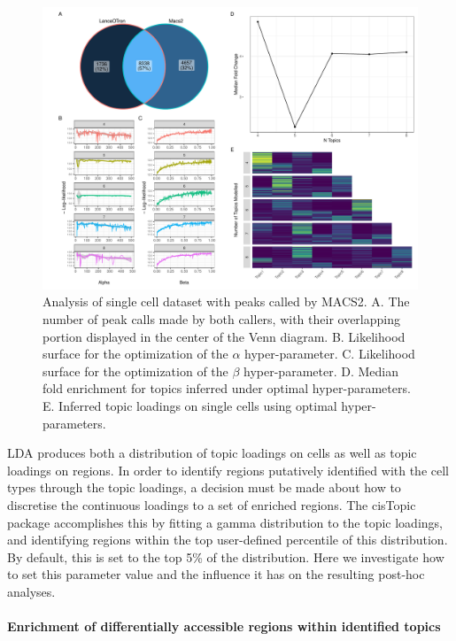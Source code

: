\begin{figure}
  \centering
  \includegraphics[width=\textwidth]{plot/ch4/sc_macs2.pdf}
  \caption{Analysis of single cell dataset with peaks called by MACS2. A. The number of peak calls made by both callers, with their overlapping portion displayed in the center of the Venn diagram. B. Likelihood surface for the optimization of the $\alpha$ hyper-parameter. C. Likelihood surface for the optimization of the $\beta$ hyper-parameter. D. Median fold enrichment for topics inferred under optimal hyper-parameters. E. Inferred topic loadings on single cells using optimal hyper-parameters.}
  \label{fig:sc_macs2}
\end{figure}

LDA produces both a distribution of topic loadings on cells as well as topic loadings on regions. In order to identify regions putatively identified with the cell types through the topic loadings, a decision must be made about how to discretise the continuous loadings to a set of enriched regions. The cisTopic package accomplishes this by fitting a gamma distribution to the topic loadings, and identifying regions within the top user-defined percentile of this distribution. By default, this is set to the top 5\% of the distribution. Here we investigate how to set this parameter value and the influence it has on the resulting post-hoc analyses. 



\paragraph{Enrichment of differentially accessible regions within identified topics}

